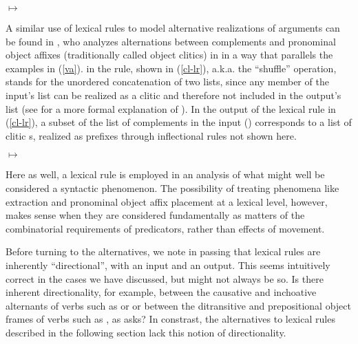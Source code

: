 \documentclass[output=paper
	        ,collection
	        ,collectionchapter
 	        ,biblatex
                ,babelshorthands
                ,newtxmath
                ,draftmode
                ,colorlinks, citecolor=brown
]{langscibook}
\begin{document}
\begin{exe}
	\ex\label{celr}
	$\mapsto$
\end{exe}


A similar use of lexical rules to model alternative realizations of arguments can be found in ,  who analyzes alternations between complements and pronominal object affixes (traditionally called object clitics) in  in a way that parallels the  examples in (\ref{va}). \shuffle\is{$\bigcirc$} in the rule, shown in (\ref{cl-lr}), a.k.a. the ``shuffle'' operation, stands for the unordered concatenation of two lists, since any member of the input's  list can be realized as a clitic and therefore not included in the output's  list (see  for a more formal explanation of \shuffle). In the output of the lexical rule in (\ref{cl-lr}), a subset of the list of complements in the input () corresponds to a list of clitic s, realized as prefixes through inflectional rules not shown here. 

\begin{exe}
	\ex\label{cl-lr}
	$\mapsto$
\end{exe}

Here as well, a lexical rule is employed in an analysis of what might well be considered a syntactic phenomenon.
The possibility of treating phenomena like extraction and pronominal object affix placement at a lexical level, however, makes sense when they are considered fundamentally as matters of the combinatorial requirements of predicators, rather than effects of movement.

Before turning to the alternatives, we note in passing that lexical rules are inherently ``directional'', with an input and an output.
This seems intuitively correct in the cases we have discussed, but might not always be so.
Is there inherent directionality, for example, between the causative and inchoative alternants of verbs such as  or  or between the ditransitive and prepositional object frames of verbs such as , as \citet{Goldberg1995} asks?
In constrast, the alternatives to lexical rules described in the following section lack this notion of directionality.
\end{document}
